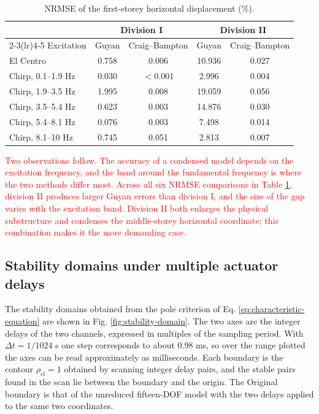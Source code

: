 \documentclass[11pt,a4paper]{article}
\numberwithin{equation}{section}
\newcommand{\rev}[1]{\textcolor{red}{#1}}
\begin{document}
\begin{table}[htbp]
	\centering
	\caption{NRMSE of the first-storey horizontal displacement (\%).}
	\label{tab:nrmse}
	\begin{tabular}{lcccc}
		\toprule
		& \multicolumn{2}{c}{Division I} & \multicolumn{2}{c}{Division II}\\
		\cmidrule(lr){2-3}\cmidrule(lr){4-5}
		Excitation & Guyan & Craig--Bampton & Guyan & Craig--Bampton\\
		\midrule
		El Centro           & 0.758 & 0.006    & 10.936 & 0.027\\
		\midrule
		Chirp, 0.1--1.9 Hz  & 0.030 & $<$0.001 & 2.996  & 0.004\\
		Chirp, 1.9--3.5 Hz  & 1.995 & 0.008    & 19.059 & 0.056\\
		Chirp, 3.5--5.4 Hz  & 0.623 & 0.003    & 14.876 & 0.030\\
		Chirp, 5.4--8.1 Hz  & 0.076 & 0.003    & 7.498  & 0.014\\
		Chirp, 8.1--10 Hz   & 0.745 & 0.051    & 2.813  & 0.007\\
		\bottomrule
	\end{tabular}
\end{table}

\rev{Two observations follow. The accuracy of a condensed model depends on the excitation frequency, and the band around the fundamental frequency is where the two methods differ most. Across all six NRMSE comparisons in Table \ref{tab:nrmse}, division II produces larger Guyan errors than division I, and the size of the gap varies with the excitation band. Division II both enlarges the physical substructure and condenses the middle-storey horizontal coordinate; this combination makes it the more demanding case.}

\subsection{Stability domains under multiple actuator delays}
\label{sec:stability-domains}

The stability domains obtained from the pole criterion of Eq. \eqref{eq:characteristic-equation} are shown in Fig. \ref{fig:stability-domain}. The two axes are the integer delays of the two channels, expressed in multiples of the sampling period. With \(\Delta t=1/1024\) s one step corresponds to about 0.98 ms, so over the range plotted the axes can be read approximately as milliseconds. Each boundary is the contour \(\rho_{\mathrm{cl}}=1\) obtained by scanning integer delay pairs, and the stable pairs found in the scan lie between the boundary and the origin. The Original boundary is that of the unreduced fifteen-DOF model with the two delays applied to the same two coordinates.
\end{document}
